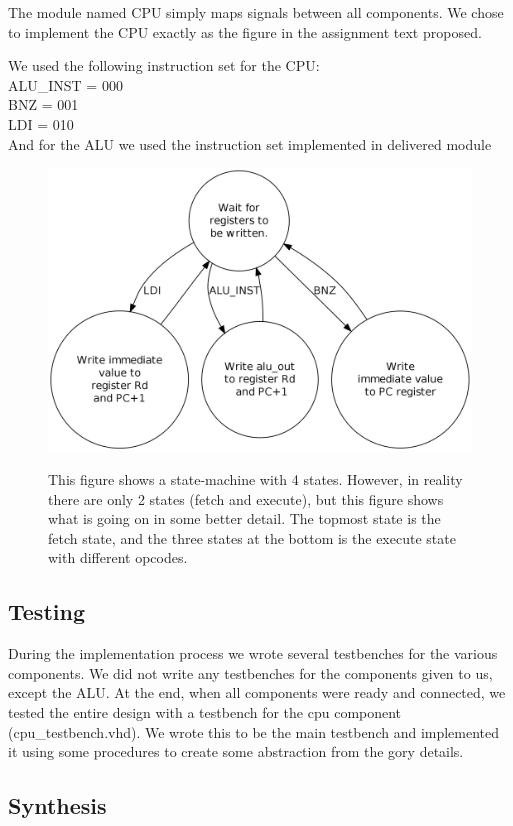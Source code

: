 \documentclass[10pt]{report}
\begin{document}
The module named CPU simply maps signals between all components.  
We chose to implement the CPU exactly as the figure in the assignment text proposed.

We used the following instruction set for the CPU:\\
ALU\_INST = 000\\
BNZ = 001\\
LDI = 010\\

And for the ALU we used the instruction set implemented in delivered module

\begin{figure}
\includegraphics[width=.75\linewidth]{state_diagram.png} \\
\caption{This figure shows a state-machine with 4 states. However, in reality there 
are only 2 states (fetch and execute), but this figure shows what is going on in some 
better detail. The topmost state is the fetch state, and the three states at the 
bottom is the execute state with different opcodes.}
\end{figure}

\subsection*{Testing}

During the implementation process we wrote several testbenches
for the various components. We did not write any testbenches for the
components given to us, except the ALU. At the end, when all components were ready and
connected, we tested the entire design with a testbench for the cpu
component (cpu\_testbench.vhd).  We wrote this to be the main
testbench and implemented it using some procedures to create some
abstraction from the gory details.

\subsection*{Synthesis}
\end{document}
